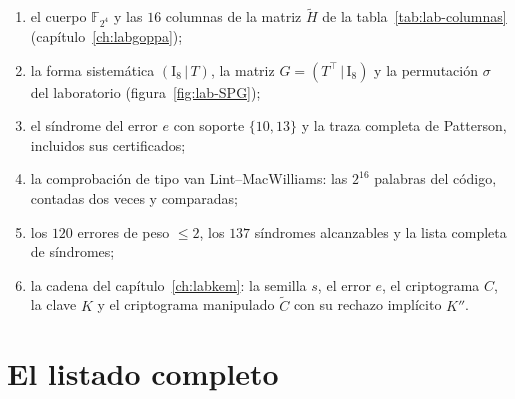 \documentclass[11pt,a4paper,oneside]{report}
\newcommand{\F}{\mathbb{F}}
\newcommand{\FF}[1]{\F_{2^{#1}}}
\begin{document}
\begin{enumerate}[leftmargin=1.8em,itemsep=2pt]
  \item el cuerpo $\FF4$ y las $16$ columnas de la matriz $\tilde H$
        de la tabla~\ref{tab:lab-columnas} (capítulo~\ref{ch:labgoppa});
  \item la forma sistemática $(\mathrm{I}_8\,|\,T)$, la matriz
        $G=(T^{\top}\,|\,\mathrm{I}_8)$ y la permutación
        $\sigma$ del laboratorio (figura~\ref{fig:lab-SPG});
  \item el síndrome del error $e$ con soporte $\{10,13\}$ y la
        traza completa de Patterson, incluidos sus certificados;
  \item la comprobación de tipo van Lint--MacWilliams: las $2^{16}$
        palabras del código, contadas dos veces y comparadas;
  \item los $120$ errores de peso $\le 2$, los $137$ síndromes
        alcanzables y la lista completa de síndromes;
  \item la cadena del capítulo~\ref{ch:labkem}: la semilla $s$, el
        error $e$, el criptograma $C$, la clave $K$ y el criptograma
        manipulado $\tilde C$ con su rechazo implícito $K''$.
\end{enumerate}

\section{El listado completo}
\end{document}
